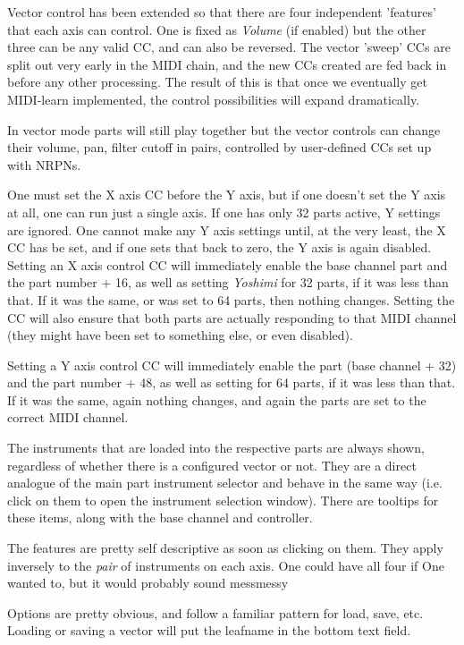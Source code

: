    Vector control has been extended so that there are four independent
   'features' that each axis can control. One is fixed as \textsl{Volume} (if
   enabled) but the other three can be any valid CC, and can also be reversed.
   The vector 'sweep' CCs are split out very early in the MIDI chain, and the
   new CCs created are fed back in before any other processing. The result of
   this is that once we eventually get MIDI-learn implemented, the control
   possibilities will expand dramatically.

   In vector mode parts will still play together but the vector controls can
   change their volume, pan, filter cutoff in pairs, controlled by user-defined
   CCs set up with NRPNs.

   One must set the X axis CC before the Y axis, but if one doesn't set the Y
   axis at all, one can run just a single axis.  If one has only 32 parts
   active, Y settings are ignored.  One cannot make any Y axis settings until,
   at the very least, the X CC has be set, and if one sets that back to zero,
   the Y axis is again disabled.  Setting an X axis control CC will immediately
   enable the base channel part and the part number + 16, as well as setting
   \textsl{Yoshimi} for 32 parts, if it was less than that. If it was the same,
   or was set to 64 parts, then nothing changes. Setting the CC will also
   ensure that both parts are actually responding to that MIDI channel (they
   might have been set to something else, or even disabled).

   Setting a Y axis control CC will immediately enable the part (base channel +
   32) and the part number + 48, as well as setting for 64 parts, if it was
   less than that. If it was the same, again nothing changes, and again the
   parts are set to the correct MIDI channel.

   The instruments that are loaded into the respective parts are always shown,
   regardless of whether there is a configured vector or not. They are a direct
   analogue of the main part instrument selector and behave in the same way
   (i.e.  click on them to open the instrument selection window).  There are
   tooltips for these items, along with the base channel and controller.

   The features are pretty self descriptive as soon as clicking on them. They
   apply inversely to the \textsl{pair} of instruments on each axis.  One could
   have all four if One wanted to, but it would probably sound messmessy

   Options are pretty obvious, and follow a familiar pattern for load, save,
   etc.  Loading or saving a vector will put the leafname in the bottom text
   field.

